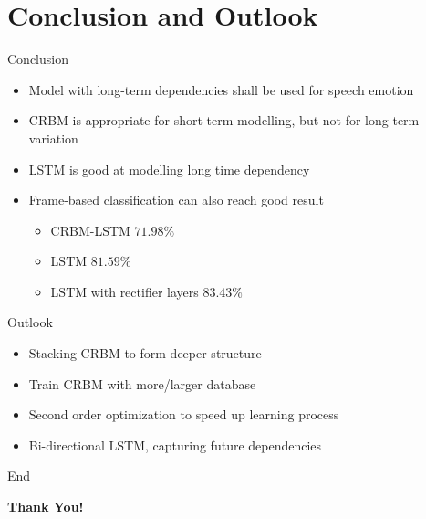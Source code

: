 % 
% 
% 
\section{Conclusion and Outlook}
      \begin{frame}[t]{Conclusion}
	  \begin{itemize}
	  \itemsep10pt
	  \item Model with long-term dependencies shall be used for speech emotion
	  \item CRBM is appropriate for short-term modelling, but not for long-term variation
	  \item LSTM is good at modelling long time dependency 
	  \item Frame-based classification can also reach good result
		\vspace{5mm}
		\begin{itemize}
		 \itemsep10pt
		 \item CRBM-LSTM $71.98\%$
		 \item LSTM $81.59\%$
		 \item LSTM with rectifier layers $83.43\%$
		\end{itemize}
	  \end{itemize}
      \end{frame}
      
      \begin{frame}[t]{Outlook}
	  \begin{itemize}
	   \itemsep15pt
	   \item Stacking CRBM to form deeper structure
	   \item Train CRBM with more/larger database 
	   \item Second order optimization to speed up learning process
	   \item Bi-directional LSTM, capturing future dependencies
	  \end{itemize}

      \end{frame}

      \begin{frame}{End}
	\begin{minipage}[c]{\linewidth}
	\centering
	\textbf{\Huge Thank You!}
	\end{minipage}
      \end{frame}




